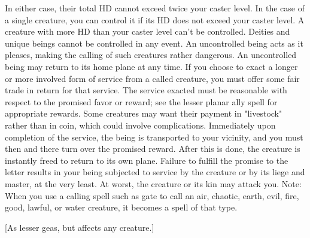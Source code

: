 {In either case, their total HD cannot exceed twice your caster level. In the case of a single creature, you can control it if its HD does not exceed your caster level. A creature with more HD than your caster level can't be controlled. Deities and unique beings cannot be controlled in any event. An uncontrolled being acts as it pleases, making the calling of such creatures rather dangerous. An uncontrolled being may return to its home plane at any time.
If you choose to exact a longer or more involved form of service from a called creature, you must offer some fair trade in return for that service. The service exacted must be reasonable with respect to the promised favor or reward; see the lesser planar ally spell for appropriate rewards. Some creatures may want their payment in "livestock" rather than in coin, which could involve complications.
Immediately upon completion of the service, the being is transported to your vicinity, and you must then and there turn over the promised reward. After this is done, the creature is instantly freed to return to its own plane.
Failure to fulfill the promise to the letter results in your being subjected to service by the creature or by its liege and master, at the very least. At worst, the creature or its kin may attack you.
Note: When you use a calling spell such as gate to call an air, chaotic, earth, evil, fire, good, lawful, or water creature, it becomes a spell of that type.}
        
[As lesser geas, but affects any creature.]
        
